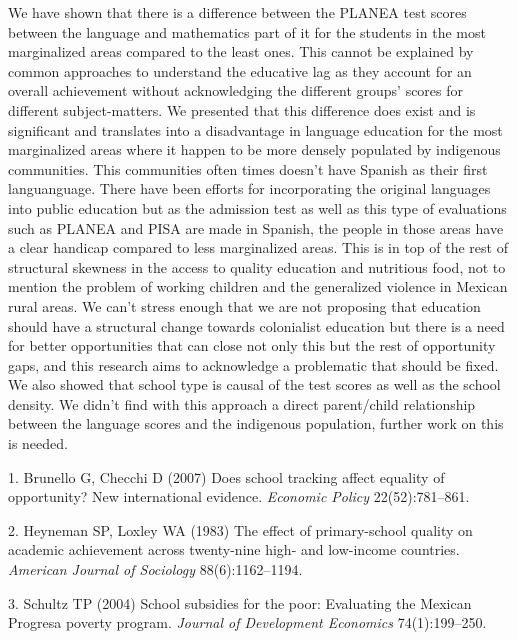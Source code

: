 \documentclass[9pt,twocolumn,twoside,]{pnas-new}
\begin{document}
We have shown that there is a difference between the PLANEA test scores
between the language and mathematics part of it for the students in the
most marginalized areas compared to the least ones. This cannot be
explained by common approaches to understand the educative lag as they
account for an overall achievement without acknowledging the different
groups' scores for different subject-matters. We presented that this
difference does exist and is significant and translates into a
disadvantage in language education for the most marginalized areas where
it happen to be more densely populated by indigenous communities. This
communities often times doesn't have Spanish as their first
languanguage. There have been efforts for incorporating the original
languages into public education but as the admission test as well as
this type of evaluations such as PLANEA and PISA are made in Spanish,
the people in those areas have a clear handicap compared to less
marginalized areas. This is in top of the rest of structural skewness in
the access to quality education and nutritious food, not to mention the
problem of working children and the generalized violence in Mexican
rural areas. We can't stress enough that we are not proposing that
education should have a structural change towards colonialist education
but there is a need for better opportunities that can close not only
this but the rest of opportunity gaps, and this research aims to
acknowledge a problematic that should be fixed. We also showed that
school type is causal of the test scores as well as the school density.
We didn't find with this approach a direct parent/child relationship
between the language scores and the indigenous population, further work
on this is needed.

\showmatmethods
\showacknow
\pnasbreak

\hypertarget{refs}{}
\leavevmode\hypertarget{ref-Brunello2007}{}%
1. Brunello G, Checchi D (2007) Does school tracking affect equality of
opportunity? New international evidence. \emph{Economic Policy}
22(52):781--861.

\leavevmode\hypertarget{ref-Heyneman1983}{}%
2. Heyneman SP, Loxley WA (1983) The effect of primary-school quality on
academic achievement across twenty-nine high- and low-income countries.
\emph{American Journal of Sociology} 88(6):1162--1194.

\leavevmode\hypertarget{ref-Schultz2004}{}%
3. Schultz TP (2004) School subsidies for the poor: Evaluating the
Mexican Progresa poverty program. \emph{Journal of Development
Economics} 74(1):199--250.
\end{document}
